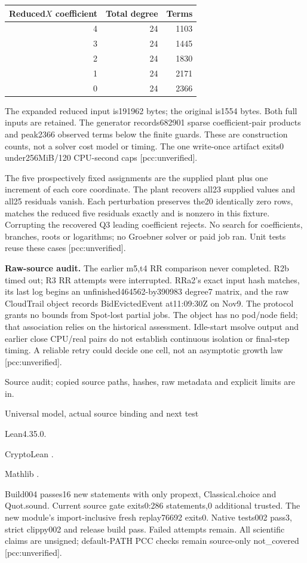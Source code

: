 \documentclass[11pt]{article}
\begin{document}
\begin{center}\small
\begin{tabular}{rrr}
Reduced$X$ coefficient & Total degree & Terms\\\hline
4&24&1103\\3&24&1445\\2&24&1830\\1&24&2171\\0&24&2366
\end{tabular}
\end{center}
The expanded reduced input is191962 bytes; the original is1554 bytes.
Both full inputs are retained. The generator records682901 sparse
coefficient-pair products and peak2366 observed terms below the finite
guards. These are construction counts, not a solver cost model or timing.
The one write-once artifact exits0 under256MiB/120 CPU-second caps
[pcc:unverified].

The five prospectively fixed assignments are the supplied plant plus one
increment of each core coordinate. The plant recovers all23 supplied values
and all25 residuals vanish. Each perturbation preserves the20 identically
zero rows, matches the reduced five residuals exactly and is nonzero in this
fixture. Corrupting the recovered Q3 leading coefficient rejects. No search
for coefficients, branches, roots or logarithms; no Groebner solver or paid
job ran. Unit tests reuse these cases [pcc:unverified].

\textbf{Raw-source audit.} The earlier m5,t4 RR comparison never completed.
R2b timed out; R3 RR attempts were interrupted. RRa2's exact input hash
matches, its last log begins an unfinished464562-by390983 degree7 matrix,
and the raw CloudTrail object records BidEvictedEvent at11:09:30Z on Nov9.
The protocol grants no bounds from Spot-lost partial jobs. The object has
no pod/node field; that association relies on the historical assessment.
Idle-start msolve output and earlier close CPU/real pairs do not establish
continuous isolation or final-step timing. A reliable retry could decide
one cell, not an asymptotic growth law [pcc:unverified].

Source audit; copied source paths, hashes, raw
metadata and explicit limits are in.

\newpage
{\Large Universal model, actual source binding and next test}\par
Lean4.35.0.\par
CryptoLean .\par
Mathlib .\par
Build004 passes16 new statements with only propext, Classical.choice and
Quot.sound. Current source gate exits0:286 statements,0 additional trusted.
The new module's import-inclusive fresh replay76692 exits0.
Native tests002 pass3, strict clippy002 and release build pass. Failed
attempts remain. All scientific claims are unsigned; default-PATH PCC
checks remain source-only not\_covered [pcc:unverified].
\end{document}
